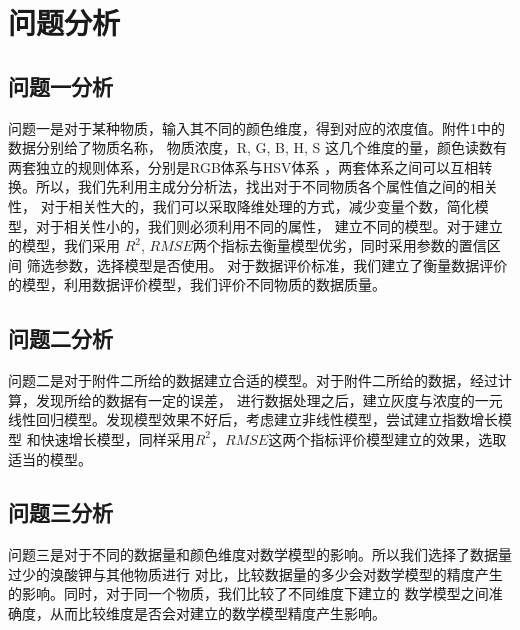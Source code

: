 \section{问题分析}
\subsection{问题一分析}
问题一是对于某种物质，输入其不同的颜色维度，得到对应的浓度值。附件1中的数据分别给了物质名称，
物质浓度，R, G, B, H, S 这几个维度的量，颜色读数有两套独立的规则体系，分别是RGB体系与HSV体系
，两套体系之间可以互相转换。所以，我们先利用主成分分析法，找出对于不同物质各个属性值之间的相关性，
对于相关性大的，我们可以采取降维处理的方式，减少变量个数，简化模型，对于相关性小的，我们则必须利用不同的属性，
建立不同的模型。对于建立的模型，我们采用 $R^2$, $RMSE$两个指标去衡量模型优劣，同时采用参数的置信区间
筛选参数，选择模型是否使用。
对于数据评价标准，我们建立了衡量数据评价的模型，利用数据评价模型，我们评价不同物质的数据质量。

\subsection{问题二分析}
问题二是对于附件二所给的数据建立合适的模型。对于附件二所给的数据，经过计算，发现所给的数据有一定的误差，
进行数据处理之后，建立灰度与浓度的一元线性回归模型。发现模型效果不好后，考虑建立非线性模型，尝试建立指数增长模型
和快速增长模型，同样采用$R^2$，$RMSE$这两个指标评价模型建立的效果，选取适当的模型。

\subsection{问题三分析}
问题三是对于不同的数据量和颜色维度对数学模型的影响。所以我们选择了数据量过少的溴酸钾与其他物质进行
对比，比较数据量的多少会对数学模型的精度产生的影响。同时，对于同一个物质，我们比较了不同维度下建立的
数学模型之间准确度，从而比较维度是否会对建立的数学模型精度产生影响。
